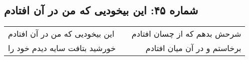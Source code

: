 \begin{center}
\section*{شماره ۴۵: این بیخودیی که من در آن افتادم}
\label{sec:045}
\begin{longtable}{l p{0.5cm} r}
این بیخودیی که من در آن افتادم
&&
شرحش بدهم که از چسان افتادم
\\
خورشید بتافت سایه دیدم خود را
&&
برخاستم و در آن میان افتادم
\\
\end{longtable}
\end{center}
